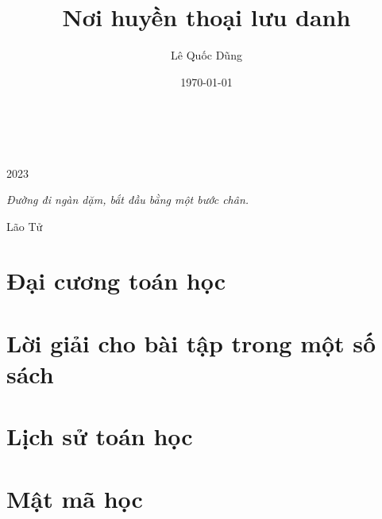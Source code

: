 \documentclass[oneside]{book}
\title{Nơi huyền thoại lưu danh}
\author{Lê Quốc Dũng}
\date{\today}
\begin{document}
\begin{titlepage}
		\\
			
		\vspace{10mm}
		\\
		\vspace{\fill}
		\centering \large{2023}
\end{titlepage}

\newpage

\vspace*{2cm}

\begin{center}
	{\Large 
			\textit{Đường đi ngàn dặm, bắt đầu bằng một bước chân.}
	}
	\Large{\parbox{10cm}{
		\begin{raggedleft}
		\vspace{.5cm}\hfill{Lão Tử}
		\end{raggedleft}
	}
}
\end{center}

\newpage

\tableofcontents

\newpage



\part{Đại cương toán học}





%




\part{Lời giải cho bài tập trong một số sách}



\part{Lịch sử toán học}


\part{Mật mã học}


\medskip


\end{document}
